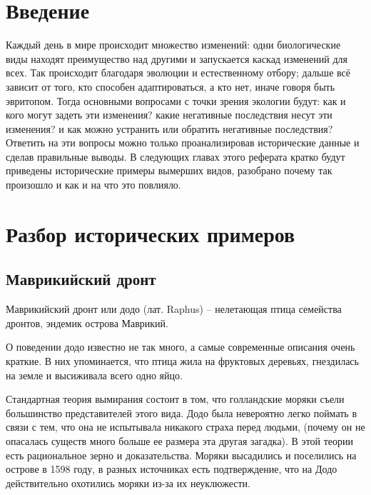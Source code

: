\documentclass[12pt]{article}
\begin{document}
    \newpage

    \pagestyle{plain}
    \setcounter{page}{1}

    \tableofcontents

    \newpage

    \section*{Введение}

    Каждый день в мире происходит множество изменений: одни биологические виды находят преимущество над другими и запускается каскад изменений для всех. Так происходит благодаря эволюции и естественному отбору; дальше всё зависит от того, кто способен адаптироваться, а кто нет, иначе говоря быть эвритопом. Тогда основными вопросами с точки зрения экологии будут: как и кого могут задеть эти изменения? какие негативные последствия несут эти изменения? и как можно устранить или обратить негативные последствия? Ответить на эти вопросы можно только проанализировав исторические данные и сделав правильные выводы. В следующих главах этого реферата кратко будут приведены исторические примеры вымерших видов, разобрано почему так произошло и как и на что это повлияло.

    \newpage
    \section{Разбор исторических примеров}

    \subsection{Маврикийский дронт}

    Маврикийский дронт или додо (лат. Raphus) -- нелетающая птица семейства дронтов, эндемик острова Маврикий.

    О поведении додо известно не так много, а самые современные описания очень краткие. В них упоминается, что птица жила на фруктовых деревьях, гнездилась на земле и высиживала всего одно яйцо.

    Стандартная теория вымирания состоит в том, что голландские моряки съели большинство представителей этого вида. Додо была невероятно легко поймать в связи с тем, что она не испытывала никакого страха перед людьми, (почему он не опасалась существ много больше ее размера эта другая загадка). В этой теории есть рациональное зерно и доказательства. Моряки высадились и поселились на острове в 1598 году, в разных источниках есть подтверждение, что на Додо действительно охотились моряки из-за их неуклюжести.
\end{document}
